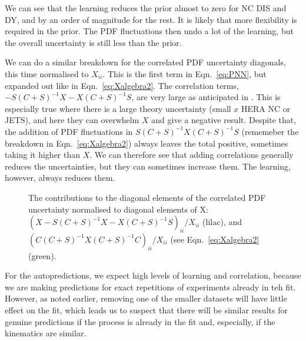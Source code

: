 We can see that the learning reduces the prior almost to zero for NC DIS and DY, and by an order of magnitude for the rest. It is likely that more flexibility is required in the prior. The PDF fluctuations then undo a lot of the learning, but the overall uncertainty is still less than the prior.

We can do a similar breakdown for the correlated PDF uncertainty diagonals, this time normalised to $X_{ii}$. This is the first term in Eqn.~\ref{eq:PNN}, but expanded out like in Eqn.~\ref{eq:Xalgebra2}. The correlation terms, $-S(C+S)^{-1}X-X(C+S)^{-1}S$, are very large as anticipated in \cite{Harland-Lang:2018bxd}. This is especially true where there is a large theory uncertainty (small $x$ HERA NC or JETS), and here they can overwhelm $X$ and give a negative result. Despite that, the addition of PDF fluctuations in $S(C+S)^{-1}X(C+S)^{-1}S$ (rememeber the breakdown in Eqn.~\ref{eq:Xalgebra2}) always leaves the total positive, sometimes taking it higher than $X$. We can therefore see that adding correlations generally reduces the uncertainties, but they can sometimes increase them. The learning, however, always reduces them.
\begin{figure}[H]
    \begin{center}
    \end{center}
  \vspace{-0.55cm}
  \caption{The contributions to the diagonal elements of the correlated PDF uncertainty normalised to diagonal elements of X: $(X-S(C+S)^{-1}X-X(C+S)^{-1}S)_{ii}/X_{ii}$ (lilac), and  $(C(C+S)^{-1}X(C+S)^{-1}C )_{ii}/X_{ii}$  (see Eqn.~\ref{eq:Xalgebra2} (green).}
  \label{fig:Xcpts}
\end{figure}
For the autopredictions, we expect high levels of learning and correlation, because we are making predictions for exact repetitions of experiments already in teh fit. However, as noted earlier, removing one of the smaller datasets will have little effect on the fit, which leads us to suspect that there will be similar results for genuine predictions if the process is already in the fit and, especially, if the kinematics are similar.

